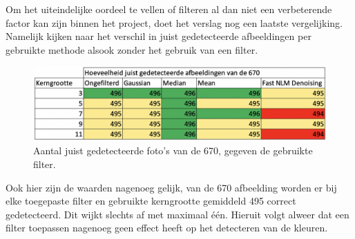 Om het uiteindelijke oordeel te vellen of filteren al dan niet een verbeterende factor kan zijn binnen het project, doet het verslag nog een laatste vergelijking. Namelijk kijken naar het verschil in juist gedetecteerde afbeeldingen per gebruikte methode alsook zonder het gebruik van een filter.

\begin{figure}[h!]
  \includegraphics[width=\linewidth]{img/filternofilter}
  \caption{Aantal juist gedetecteerde foto's van de 670, gegeven de gebruikte filter.}
  \label{fig:filternofilter}
\end{figure}

Ook hier zijn de waarden nagenoeg gelijk, van de 670 afbeelding worden er bij elke toegepaste filter en gebruikte kerngrootte gemiddeld 495 correct gedetecteerd. Dit wijkt slechts af met maximaal één. Hieruit volgt alweer dat een filter toepassen nagenoeg geen effect heeft op het detecteren van de kleuren.